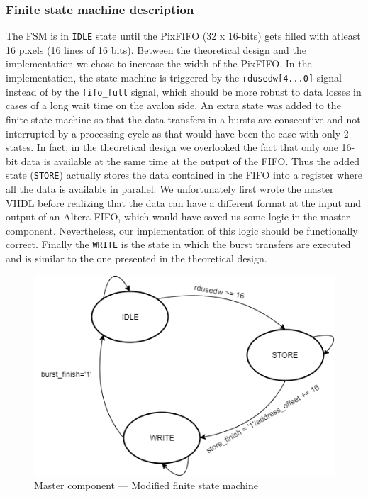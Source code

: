 \documentclass{article}
\begin{document}
\subsubsection{Finite state machine description}

The FSM is in \verb'IDLE' state until the PixFIFO (32 x 16-bits) gets filled with atleast 16 pixels (16 lines of 16 bits). Between the theoretical design and the implementation we chose to increase the width of the PixFIFO. In the implementation, the state machine is triggered by the \verb'rdusedw[4...0]' signal instead of by the \verb'fifo_full' signal, which should be more robust to data losses in cases of a long wait time on the avalon side. An extra state was added to the finite state machine so that the data transfers in a bursts are consecutive and not interrupted by a processing cycle as that would have been the case with only 2 states. In fact, in the theoretical design we overlooked the fact that only one 16-bit data is available at the same time at the output of the FIFO. Thus the added state (\verb'STORE') actually stores the data contained in the FIFO into a register where all the data is available in parallel. We unfortunately first wrote the master VHDL before realizing that the data can have a different format at the input and output of an Altera FIFO, which would have saved us some logic in the master component. Nevertheless, our implementation of this logic should be functionally correct. Finally the \verb'WRITE' is the state in which the burst transfers are executed and is similar to the one presented in the theoretical design.

\begin{figure}[H]
\centering
\includegraphics[scale=0.45]{images/MasterFSM.png}
\caption{Master component --- Modified finite state machine}
\label{fig:MasterFSM}
\end{figure}
\end{document}

